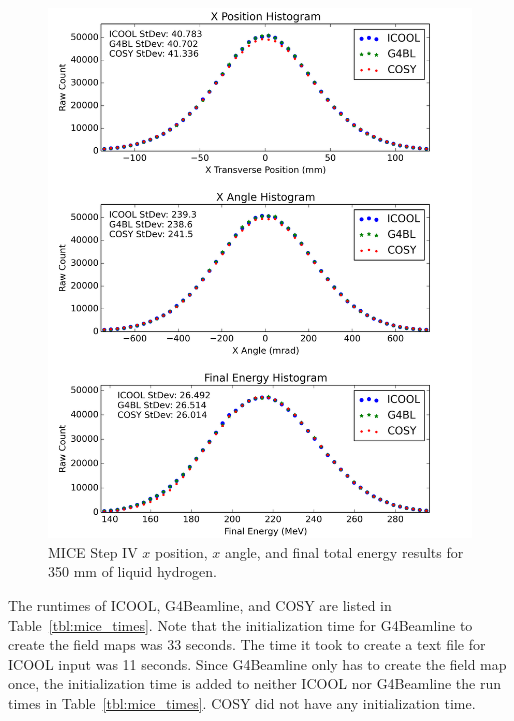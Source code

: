 \documentclass{jacow}
\begin{document}
\begin{figure}[htb]
  \centering
    \includegraphics[width=\columnwidth]{MICE_LH} 
  \caption{MICE Step IV $x$ position, $x$ angle, and final total energy results for 350 mm of liquid hydrogen.}
  \label{fig:MICE_LH}
\end{figure}

The runtimes of ICOOL, G4Beamline, and COSY are listed in Table~\ref{tbl:mice_times}. %
Note that the initialization time for G4Beamline to create the field maps was 33 seconds. The time it took to create a text file for ICOOL input was 11 seconds. Since G4Beamline only has to create the field map once, the initialization time is added to neither ICOOL nor G4Beamline the run times in Table~\ref{tbl:mice_times}. COSY did not have any initialization time.
\end{document}

